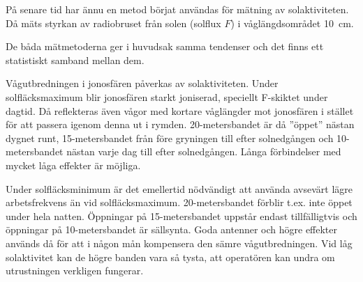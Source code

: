På senare tid har ännu en metod börjat användas för mätning av
solaktiviteten. Då mäts styrkan av radiobruset från solen (solflux
\(F\)) i våglängdsområdet 10~cm.

De båda mätmetoderna ger i huvudsak samma tendenser och det finns ett
statistiskt samband mellan dem.

Vågutbredningen i jonosfären påverkas av solaktiviteten. Under
solfläcksmaximum blir jonosfären starkt joniserad, speciellt F-skiktet
under dagtid. Då reflekteras även vågor med kortare våglängder mot
jonosfären i stället för att passera igenom denna ut i
rymden. 20-metersbandet är då ''öppet'' nästan dygnet runt,
15-metersbandet från före gryningen till efter solnedgången och
10-metersbandet nästan varje dag till efter solnedgången. Långa
förbindelser med mycket låga effekter är möjliga.

Under solfläcksminimum är det emellertid nödvändigt att använda
avsevärt lägre arbetsfrekvens än vid solfläcksmaximum.
20-metersbandet förblir t.ex. inte öppet under hela natten. Öppningar
på 15-metersbandet uppstår endast tillfälligtvis och öppningar på
10-metersbandet är sällsynta.  Goda antenner och högre effekter
används då för att i någon mån kompensera den sämre
vågutbredningen. Vid låg solaktivitet kan de högre banden vara så
tysta, att operatören kan undra om utrustningen verkligen fungerar.
